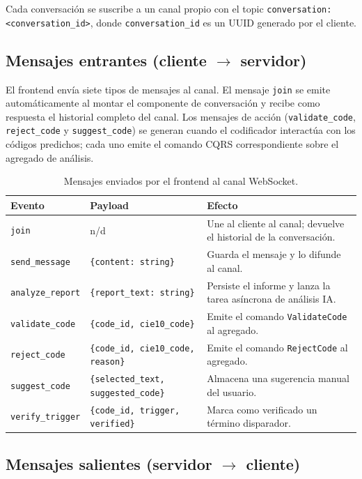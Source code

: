 Cada conversación se suscribe a un canal propio con el topic \texttt{conversation:<conversation\_id>}, donde \texttt{conversation\_id} es un UUID generado por el cliente.

\subsection{Mensajes entrantes (cliente \texorpdfstring{$\rightarrow$}{->} servidor)}

El frontend envía siete tipos de mensajes al canal. El mensaje \texttt{join} se emite automáticamente al montar el componente de conversación y recibe como respuesta el historial completo del canal. Los mensajes de acción (\texttt{validate\_code}, \texttt{reject\_code} y \texttt{suggest\_code}) se generan cuando el codificador interactúa con los códigos predichos; cada uno emite el comando CQRS correspondiente sobre el agregado de análisis.

\begin{table}[H]
\centering
\caption{Mensajes enviados por el frontend al canal WebSocket.}
\label{tab:ws-in}
\begin{tabular}{lp{4.5cm}p{5.5cm}}
\hline
\textbf{Evento} & \textbf{Payload} & \textbf{Efecto} \\
\hline
\texttt{join} &  n/d & Une al cliente al canal; devuelve el historial de la conversación. \\
\texttt{send\_message} & \texttt{\{content: string\}} & Guarda el mensaje y lo difunde al canal. \\
\texttt{analyze\_report}& \texttt{\{report\_text: string\}} & Persiste el informe y lanza la tarea asíncrona de análisis IA. \\
\texttt{validate\_code} & \texttt{\{code\_id, cie10\_code\}} & Emite el comando \texttt{ValidateCode} al agregado. \\
\texttt{reject\_code} & \texttt{\{code\_id, cie10\_code, reason\}} & Emite el comando \texttt{RejectCode} al agregado. \\
\texttt{suggest\_code} & \texttt{\{selected\_text, suggested\_code\}} & Almacena una sugerencia manual del usuario. \\
\texttt{verify\_trigger} & \texttt{\{code\_id, trigger, verified\}} & Marca como verificado un término disparador. \\
\hline
\end{tabular}
\end{table}

\subsection{Mensajes salientes (servidor \texorpdfstring{$\rightarrow$}{->} cliente)}

